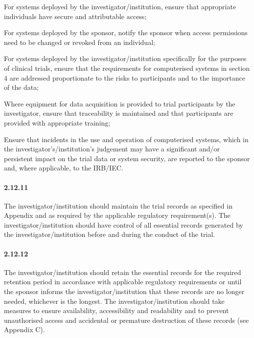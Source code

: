 \documentclass[11pt]{article}
\begin{document}
\begin{description}[leftmargin=2.5cm,style=sameline]

\item[(a)] For systems deployed by the investigator/institution, ensure that appropriate individuals have secure and attributable access;

\item[(b)] For systems deployed by the sponsor, notify the sponsor when access permissions need to be changed or revoked from an individual;

\item[(c)] For systems deployed by the investigator/institution specifically for the purposes of clinical trials, ensure that the requirements for computerised systems in section 4 are addressed proportionate to the risks to participants and to the importance of the data;

\item[(d)] Where equipment for data acquisition is provided to trial participants by the investigator, ensure that traceability is maintained and that participants are provided with appropriate training;

\item[(e)] Ensure that incidents in the use and operation of computerised systems, which in the investigator's/institution's judgement may have a significant and/or persistent impact on the trial data or system security, are reported to the sponsor and, where applicable, to the IRB/IEC.

\end{description}

\paragraph{2.12.11} The investigator/institution should maintain the trial records as specified in Appendix and as required by the applicable regulatory requirement(s). The investigator/institution should have control of all essential records generated by the investigator/institution before and during the conduct of the trial.

\paragraph{2.12.12} The investigator/institution should retain the essential records for the required retention period in accordance with applicable regulatory requirements or until the sponsor informs the investigator/institution that these records are no longer needed, whichever is the longest. The investigator/institution should take measures to ensure availability, accessibility and readability and to prevent unauthorised access and accidental or premature destruction of these records (see Appendix C).
\end{document}
